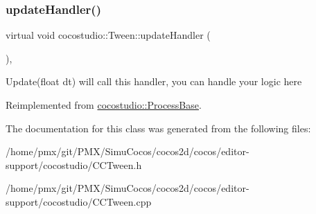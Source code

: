 \mbox{\label{classcocostudio_1_1Tween_ac595b653e11b8548f9ce599c0bc79f08}} 
\subsubsection{\texorpdfstring{update\+Handler()}{updateHandler()}\hspace{0.1cm}{\footnotesize\ttfamily [2/2]}}
{\footnotesize\ttfamily virtual void cocostudio\+::\+Tween\+::update\+Handler (\begin{DoxyParamCaption}{ }\end{DoxyParamCaption})\hspace{0.3cm}{\ttfamily [protected]}, {\ttfamily [virtual]}}

Update(float dt) will call this handler, you can handle your logic here 

Reimplemented from \hyperlink{classcocostudio_1_1ProcessBase_adb15615e852617daf7a4f13b17bfc553}{cocostudio\+::\+Process\+Base}.



The documentation for this class was generated from the following files\+:\begin{DoxyCompactItemize}
\item 
/home/pmx/git/\+P\+M\+X/\+Simu\+Cocos/cocos2d/cocos/editor-\/support/cocostudio/C\+C\+Tween.\+h\item 
/home/pmx/git/\+P\+M\+X/\+Simu\+Cocos/cocos2d/cocos/editor-\/support/cocostudio/C\+C\+Tween.\+cpp\end{DoxyCompactItemize}
